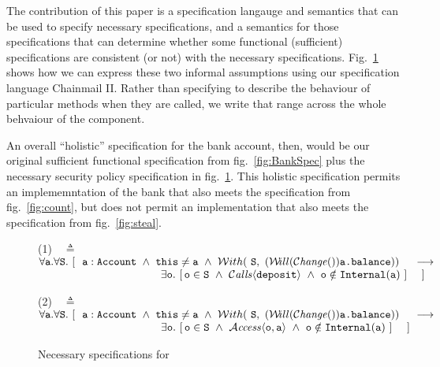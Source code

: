 The contribution of this paper is a specification langauge and
semantics that can be used to specify necessary specifications, and a
semantics for those specifications that can determine whether some
functional (sufficient) specifications are consistent (or not) with
the necessary specifications. Fig.~\ref{fig:nec} shows how we
can express these two informal assumptions using our specification
language Chainmail II.  Rather than specifying  to
describe the behaviour of particular methods when they are called, we
write  that range across the whole behvaiour of the
component.


An overall ``holistic'' specification for the bank account, then,
would be our original sufficient functional specification from
fig.~\ref{fig:BankSpec} plus the necessary security policy
specification in fig.~\ref{fig:nec}.  This holistic specification
permits an implememntation of the bank that also meets the 
specification from fig.~\ref{fig:count}, but does not permit an
implementation that also meets the  specification from
fig.~\ref{fig:steal}.


\begin{figure}[htbp]

    (1)\ \  $\triangleq$\ \ $\forall \prg{a}.\forall \prg{S}.\ [ \ \  \prg{a}:\prg{Account}\   \wedge\   \prg{this}\neq\prg{a} \ \wedge\ \Using{(\Future\Changes{\prg{a.balance}})}{\prg{S}}\ \ \   \
    \longrightarrow$ \\
 $\strut \hspace{3.9cm} \hfill \exists \prg{o}.\ [\, \prg{o}\in \prg{S}\ \wedge \ \Calls{\prg{deposit}}\ \wedge  \ \prg{o} \notin\prg{Internal}(\prg{a}) \ ] \ \ \ \ ]$

\vspace{.1cm}

    (2)\ \  $\triangleq$\ \ $\forall \prg{a}.\forall \prg{S}.\ [ \ \  \prg{a}:\prg{Account}\   \wedge\   \prg{this}\neq\prg{a} \ \wedge\ \Using{(\Future\Changes{\prg{a.balance}})}{\prg{S}}\ \ \   \
    \longrightarrow$ \\
 $\strut \hspace{3.9cm} \hfill \exists \prg{o}.\ [\, \prg{o}\in \prg{S}\ \wedge \ \CanAccess{\prg{o}}{\prg{a}}\ \wedge  \ \prg{o} \notin\prg{Internal}(\prg{a}) \ ] \ \ \ \ ]$


\caption{Necessary specifications for }
\label{fig:nec}
\end{figure}


